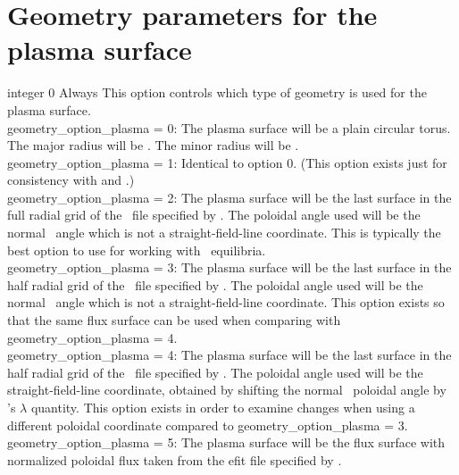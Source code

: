 \section{Geometry parameters for the plasma surface}

{integer}
{0}
{Always}
{This option controls which type of geometry is used for the plasma surface.\\

{\ttfamily geometry\_option\_plasma} = 0: The plasma surface will be a plain circular torus. The major radius will be .
     The minor radius will be .\\

{\ttfamily geometry\_option\_plasma} = 1: Identical to option 0. (This option exists just for consistency with  and .)\\

{\ttfamily geometry\_option\_plasma} = 2: The plasma surface will be the last surface in the full radial grid of the \vmec~file specified by .
The poloidal angle used will be the normal \vmec~angle which is not a straight-field-line coordinate.
This is typically the best option to use for working with \vmec~equilibria.\\

{\ttfamily geometry\_option\_plasma} = 3: The plasma surface will be the last surface in the half radial grid of the \vmec~file specified by .
The poloidal angle used will be the normal \vmec~angle which is not a straight-field-line coordinate.
This option exists so that the same flux surface can be used when comparing with {\ttfamily geometry\_option\_plasma} = 4.\\

{\ttfamily geometry\_option\_plasma} = 4: The plasma surface will be the last surface in the half radial grid of the \vmec~file specified by .
The poloidal angle used will be the straight-field-line coordinate, obtained by shifting the normal \vmec~poloidal angle by \vmec's $\lambda$ quantity.
This option exists in order to examine changes when using a different poloidal coordinate compared to {\ttfamily geometry\_option\_plasma} = 3.\\

{\ttfamily geometry\_option\_plasma} = 5: The plasma surface will be the flux surface with normalized poloidal flux
 taken from the {\ttfamily efit} file specified by .
}

